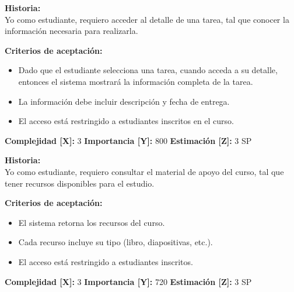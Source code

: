 \documentclass[12pt,a4paper]{article}
\begin{document}
\vspace{0.5em}

\begin{tcolorbox}[title=\textbf{HU-08: Acceder al detalle de una tarea}]
\textbf{Historia:} \\
Yo como estudiante, requiero acceder al detalle de una tarea, tal que conocer la información necesaria para realizarla.

\vspace{0.5em}
\textbf{Criterios de aceptación:}
\begin{itemize}
    \item Dado que el estudiante selecciona una tarea, cuando acceda a su detalle, entonces el sistema mostrará la información completa de la tarea.
    \item La información debe incluir descripción y fecha de entrega.
    \item El acceso está restringido a estudiantes inscritos en el curso.
\end{itemize}
\textbf{Complejidad [X]:} 3 \hfill \textbf{Importancia [Y]:} 800 \hfill \textbf{Estimación [Z]:} 3 SP
\end{tcolorbox}

\vspace{0.5em}

\begin{tcolorbox}[title=\textbf{HU-09: Consultar material de apoyo del curso}]
\textbf{Historia:} \\
Yo como estudiante, requiero consultar el material de apoyo del curso, tal que tener recursos disponibles para el estudio.

\vspace{0.5em}
\textbf{Criterios de aceptación:}
\begin{itemize}
    \item El sistema retorna los recursos del curso.
    \item Cada recurso incluye su tipo (libro, diapositivas, etc.).
    \item El acceso está restringido a estudiantes inscritos.
\end{itemize}
\textbf{Complejidad [X]:} 3 \hfill \textbf{Importancia [Y]:} 720 \hfill \textbf{Estimación [Z]:} 3 SP
\end{tcolorbox}

\vspace{0.5em}
\end{document}
